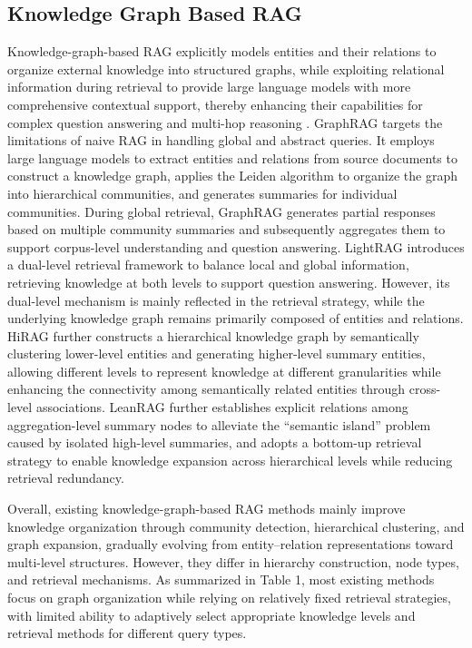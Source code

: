 \documentclass[preprint,12pt,authoryear]{elsarticle}
\begin{document}
\subsection{Knowledge Graph Based RAG}
\label{subsec:graph-rag}
Knowledge-graph-based RAG explicitly models entities and their relations to organize external knowledge into structured graphs, while exploiting relational information during retrieval to provide large language models with more comprehensive contextual support, thereby enhancing their capabilities for complex question answering and multi-hop reasoning \citep{peng2025graphrag}. GraphRAG \citep{edge2024graphrag} targets the limitations of naive RAG in handling global and abstract queries. It employs large language models to extract entities and relations from source documents to construct a knowledge graph, applies the Leiden algorithm to organize the graph into hierarchical communities, and generates summaries for individual communities. During global retrieval, GraphRAG generates partial responses based on multiple community summaries and subsequently aggregates them to support corpus-level understanding and question answering. LightRAG \citep{guo2025lightrag} introduces a dual-level retrieval framework to balance local and global information, retrieving knowledge at both levels to support question answering. However, its dual-level mechanism is mainly reflected in the retrieval strategy, while the underlying knowledge graph remains primarily composed of entities and relations. HiRAG \citep{huang2025hirag} further constructs a hierarchical knowledge graph by semantically clustering lower-level entities and generating higher-level summary entities, allowing different levels to represent knowledge at different granularities while enhancing the connectivity among semantically related entities through cross-level associations. LeanRAG \citep{zhang2026leanrag} further establishes explicit relations among aggregation-level summary nodes to alleviate the “semantic island” problem caused by isolated high-level summaries, and adopts a bottom-up retrieval strategy to enable knowledge expansion across hierarchical levels while reducing retrieval redundancy.

Overall, existing knowledge-graph-based RAG methods mainly improve knowledge organization through community detection, hierarchical clustering, and graph expansion, gradually evolving from entity--relation representations toward multi-level structures. However, they differ in hierarchy construction, node types, and retrieval mechanisms. As summarized in Table 1, most existing methods focus on graph organization while relying on relatively fixed retrieval strategies, with limited ability to adaptively select appropriate knowledge levels and retrieval methods for different query types.

\end{document}
